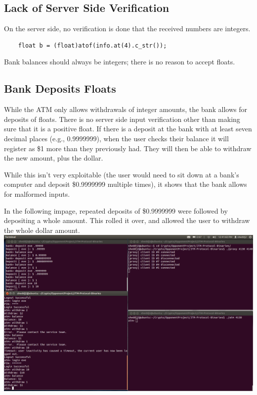\documentclass{article}
\begin{document}
\subsection{Lack of Server Side Verification}
On the server side, no verification is done that the received numbers are integers.
\begin{lstlisting}
    float b = (float)atof(info.at(4).c_str());
\end{lstlisting}
Bank balances should always be integers; there is no reason to accept floats.

\subsection{Bank Deposits Floats}
While the ATM only allows withdrawals of integer amounts, the bank allows for deposits of floats. There is no server side input verification other than making sure that it is a positive float. If there is a deposit at the bank with at least seven decimal places (e.g., 0.9999999), when the user checks their balance it will register as \$1 more than they previously had. They will then be able to withdraw the new amount, plus the dollar.

While this isn't very exploitable (the user would need to sit down at a bank's computer and deposit \$0.9999999 multiple times), it shows that the bank allows for malformed inputs.

In the following impage, repeated deposits of \$0.9999999 were followed by depositing a whole amount. This rolled it over, and allowed the user to withdraw the whole dollar amount.
\\
\includegraphics[scale=0.25]{StrangeFloatBehavior.png}
\\
\end{document}
